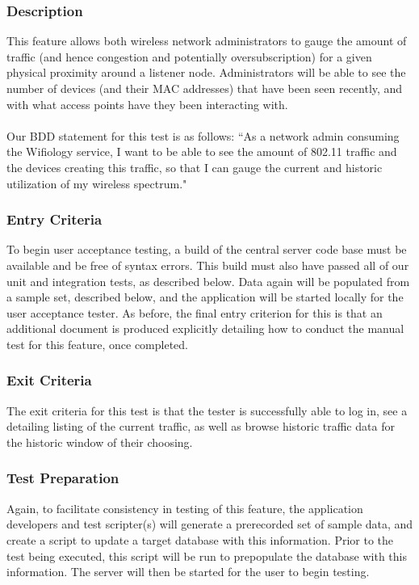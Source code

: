 \documentclass[]{article}
\begin{document}
	\subsubsection{Description}	
	This feature allows both wireless network administrators to gauge the amount of traffic (and hence 
	congestion and potentially oversubscription) for a given physical proximity around a listener node. Administrators
	will be able to see the number of devices (and their MAC addresses) that have been seen recently, and with what
	access points have they been interacting with.
	
	\paragraph{}
	Our BDD statement for this test is as follows: ``As a network admin consuming the Wifiology service, I want to
	be able to see the amount of 802.11 traffic and the devices creating this traffic, so that I can gauge 
	the current and historic utilization of my wireless spectrum."
	
    \subsubsection{Entry Criteria}	
    To begin user acceptance testing, a build of the central server code base must be available and be free of syntax errors.
	This build must also have passed all of our unit and integration tests, as described below. 	Data again will be populated from
	a sample set, described below, and the application will be started locally for the user acceptance tester. As before,
	the final entry criterion for this is that an additional document is produced explicitly detailing how to conduct the
	manual test for this feature, once completed. 
    
    \subsubsection{Exit Criteria}
    
    The exit criteria for this test is that the tester is successfully able to log in, see a detailing listing of the
    current traffic, as well as browse historic traffic data for the historic window of their choosing.
	
	\subsubsection{Test Preparation}	
	Again, to facilitate consistency in testing of this feature, the application developers and test scripter(s) will generate
	a prerecorded set of sample data, and create a script to update a target database with this information. Prior to
	the test being executed, this script will be run to prepopulate the database with this information. The server
	will then be started for the user to begin testing.
	
\end{document}
